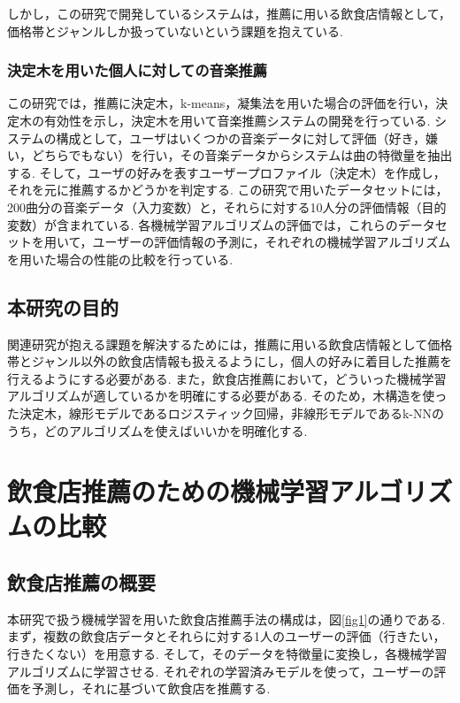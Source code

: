 \documentclass[12pt,a4j]{jreport}
\begin{document}
しかし，この研究で開発しているシステムは，推薦に用いる飲食店情報として，価格帯とジャンルしか扱っていないという課題を抱えている.

\subsection{決定木を用いた個人に対しての音楽推薦\cite{c}}
この研究では，推薦に決定木，k-means，凝集法を用いた場合の評価を行い，決定木の有効性を示し，決定木を用いて音楽推薦システムの開発を行っている.
システムの構成として，ユーザはいくつかの音楽データに対して評価（好き，嫌い，どちらでもない）を行い，その音楽データからシステムは曲の特徴量を抽出する.
そして，ユーザの好みを表すユーザープロファイル（決定木）を作成し，それを元に推薦するかどうかを判定する.
この研究で用いたデータセットには，200曲分の音楽データ（入力変数）と，それらに対する10人分の評価情報（目的変数）が含まれている.
各機械学習アルゴリズムの評価では，これらのデータセットを用いて，ユーザーの評価情報の予測に，それぞれの機械学習アルゴリズムを用いた場合の性能の比較を行っている.

\section{本研究の目的}
関連研究が抱える課題を解決するためには，推薦に用いる飲食店情報として価格帯とジャンル以外の飲食店情報も扱えるようにし，個人の好みに着目した推薦を行えるようにする必要がある.
また，飲食店推薦において，どういった機械学習アルゴリズムが適しているかを明確にする必要がある.
そのため，木構造を使った決定木，線形モデルであるロジスティック回帰，非線形モデルであるk-NNのうち，どのアルゴリズムを使えばいいかを明確化する.


\chapter{飲食店推薦のための機械学習アルゴリズムの比較}
\section{飲食店推薦の概要}
本研究で扱う機械学習を用いた飲食店推薦手法の構成は，図\ref{fig1}の通りである.
まず，複数の飲食店データとそれらに対する1人のユーザーの評価（行きたい，行きたくない）を用意する.
そして，そのデータを特徴量に変換し，各機械学習アルゴリズムに学習させる.
それぞれの学習済みモデルを使って，ユーザーの評価を予測し，それに基づいて飲食店を推薦する.\\\\
\end{document}
